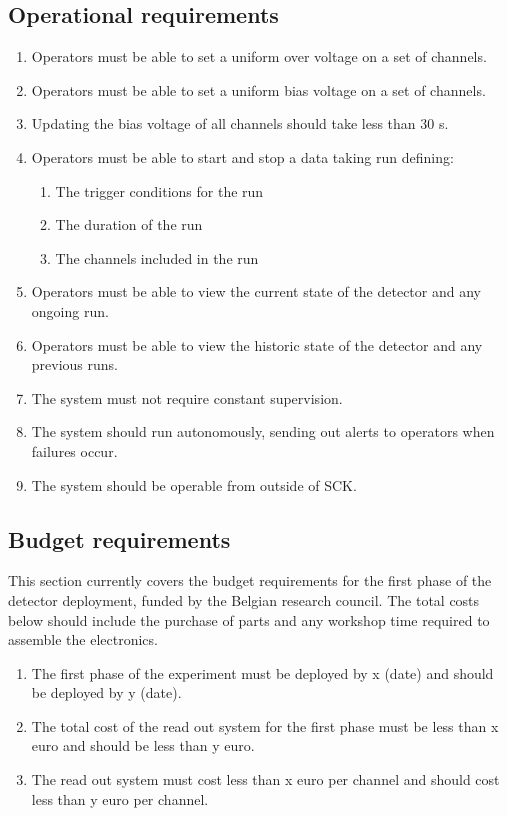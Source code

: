 \documentclass[a4paper]{article}
\begin{document}
\subsection{Operational requirements}

\begin{enumerate}
\item Operators must be able to set a uniform over voltage on a set of channels. 
\item Operators must be able to set a uniform bias voltage on a set of channels.
\item Updating the bias voltage of all channels should take less than 30 s.
\item Operators must be able to start and stop a data taking run defining:
    \begin{enumerate}
    \item The trigger conditions for the run
    \item The duration of the run
    \item The channels included in the run
    \end{enumerate}
\item Operators must be able to view the current state of the detector and any ongoing run.
\item Operators must be able to view the historic state of the detector and any previous runs. 
\item The system must not require constant supervision.
\item The system should run autonomously, sending out alerts to operators when failures occur.
\item The system should be operable from outside of SCK.
\end{enumerate}

\subsection{Budget requirements}

This section currently covers the budget requirements for the first phase of the detector deployment, funded by the Belgian research council. 
The total costs below should include the purchase of parts and any workshop time required to assemble the electronics.
\begin{enumerate}
\item The first phase of the experiment must be deployed by x (date) and should be deployed by y (date). 
\item The total cost of the read out system for the first phase must be less than x euro and should be less than y euro.
\item The read out system must cost less than x euro per channel and should cost less than y euro per channel.
\end{enumerate}
\end{document}

